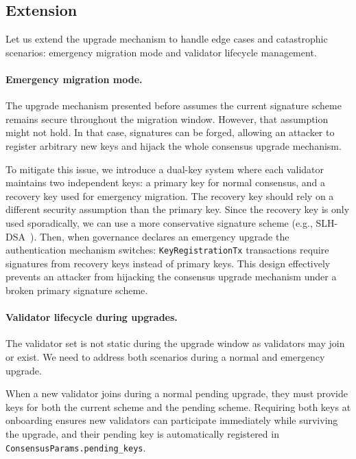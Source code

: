 

\subsection{Extension}

Let us extend the upgrade mechanism to handle edge cases and catastrophic scenarios: emergency migration mode and validator lifecycle management.

\paragraph{Emergency migration mode.} The upgrade mechanism presented before assumes the current signature scheme remains secure throughout the migration window. 
However, that assumption might not hold. 
In that case, signatures can be forged, allowing an attacker to register arbitrary new keys and hijack the whole consensus upgrade mechanism.

To mitigate this issue, we introduce a dual-key system where each validator maintains two independent keys: a primary key for normal consensus, and a recovery key used for emergency migration.
The recovery key should rely on a different security assumption than the primary key.
Since the recovery key is only used sporadically, we can use a more conservative signature scheme (e.g., SLH-DSA~\cite{NIST:24SLH}).
Then, when governance declares an emergency upgrade the authentication mechanism switches: \texttt{KeyRegistrationTx} transactions require signatures from recovery keys instead of primary keys. 
This design effectively prevents an attacker from hijacking the consensus upgrade mechanism under a broken primary signature scheme. 

\paragraph{Validator lifecycle during upgrades.} The validator set is not static during the upgrade window as validators may join or exist.
We need to address both scenarios during a normal and emergency upgrade.

When a new validator joins during a normal pending upgrade, they must provide keys for both the current scheme and the pending scheme.
Requiring both keys at onboarding ensures new validators can participate immediately while surviving the upgrade, and their pending key is automatically registered in \texttt{ConsensusParams.pending\_keys}.

